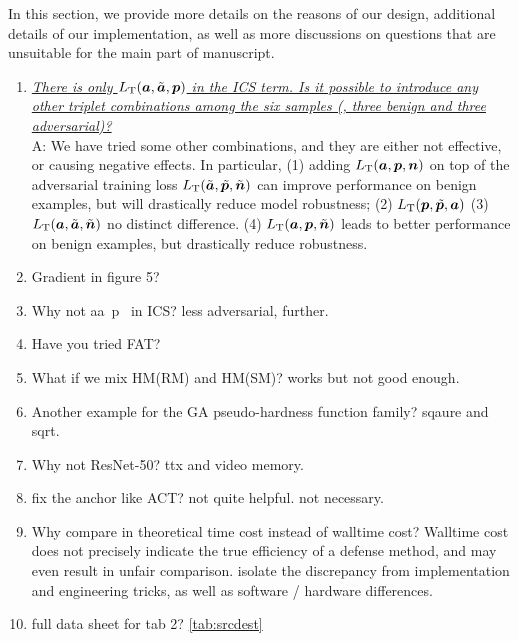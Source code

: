 In this section, we provide more details on the reasons of our design,
additional details of our implementation, as well as more discussions
on questions that are unsuitable for the main part of manuscript.

\begin{enumerate}[noitemsep]
	\item \ul{\it There is only $L_\text{T}({\bm{a}}, \tilde{{\bm{a}}}, {\bm{p}})$ in the ICS
		term.  Is it possible to introduce any other triplet combinations among
		the six samples (\ie, three benign and three adversarial)?}\\
		A: We have tried some other combinations, and they are either not
		effective, or causing negative effects.
		In particular, (1) adding $L_\text{T}({\bm{a}}, {\bm{p}}, {\bm{n}})$ on top of the
		adversarial training loss
		$L_\text{T}(\tilde{{\bm{a}}},\tilde{{\bm{p}}},\tilde{{\bm{n}}})$ can improve
		performance on benign examples, but will drastically reduce model
		robustness;
		(2) $L_\text{T}({\bm{p}}, \tilde{{\bm{p}}}, {\bm{a}})$ 
		(3) $L_\text{T}({\bm{a}}, \tilde{{\bm{a}}}, \tilde{{\bm{n}}})$ no distinct difference.
		(4) $L_\text{T}({\bm{a}}, {\bm{p}}, \tilde{{\bm{n}}})$ leads to better performance
		on benign examples, but drastically reduce robustness.

	\item Gradient in figure 5?

	\item Why not aa~p~ in ICS?
		less adversarial, further.
	\item Have you tried FAT?
	\item What if we mix HM(RM) and HM(SM)?
		works but not good enough.
	\item Another example for the GA pseudo-hardness function family?
		sqaure and sqrt.
	\item Why not ResNet-50?
		ttx and video memory.
	\item fix the anchor like ACT?
		not quite helpful. not necessary.
	\item Why compare in theoretical time cost instead of walltime cost?
		Walltime cost does not precisely indicate the true efficiency
		of a defense method, and may even result in unfair comparison.
		isolate the discrepancy from implementation and engineering tricks,
		as well as software / hardware differences.
	\item full data sheet for tab 2?
		\cref{tab:srcdest}


\end{enumerate}
